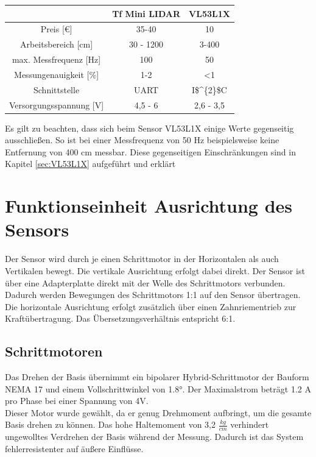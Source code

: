 \begin{center}
	\begin{tabular} [H] {|c|c|c|}
		\hline
		\textbf{} 				& \textbf{Tf Mini LIDAR}	& \textbf{VL53L1X} 	 \\ \hline
		Preis [€]				&  35-40					& 10			\\ \hline
		Arbeitsbereich [cm]		&  30 - 1200   				& 3-400			\\ \hline
		max. Messfrequenz [Hz]	&  100						& 50 			\\ \hline
		Messungenauigkeit [\%]	&  1-2 						& <1			\\ \hline
		Schnittstelle 			&  \ac{UART}				& \ac{I$^{2}$C}\\ \hline
		Versorgungsspannung [V] &  4,5 - 6 					& 2,6 - 3,5		\\ \hline
		
		\end {tabular}
		\label{vergleich}
	\end{center}

Es gilt zu beachten, dass sich beim Sensor VL53L1X einige Werte gegenseitig ausschließen. So ist bei einer Messfrequenz von 50 Hz beispielsweise keine Entfernung von 400 cm messbar. Diese gegenseitigen Einschränkungen sind in Kapitel \ref{sec:VL53L1X} aufgeführt und erklärt

 

\section{Funktionseinheit Ausrichtung des Sensors}

Der Sensor wird durch je einen Schrittmotor in der Horizontalen als auch Vertikalen bewegt. Die vertikale Ausrichtung erfolgt dabei direkt. Der Sensor ist über eine Adapterplatte direkt mit der Welle des Schrittmotors verbunden. Dadurch werden Bewegungen des Schrittmotors 1:1 auf den Sensor übertragen.\\ 
Die horizontale Ausrichtung erfolgt zusätzlich über einen Zahnriementrieb zur Kraftübertragung. Das Übersetzungsverhältnis entspricht 6:1.  

\subsection{Schrittmotoren}
Das Drehen der Basis übernimmt ein bipolarer Hybrid-Schrittmotor der Bauform \ac{NEMA} 17 und einem Vollschrittwinkel von 1.8°. Der Maximalstrom beträgt 1.2 A pro Phase bei einer Spannung von 4V.\\ 
Dieser Motor wurde gewählt, da er genug Drehmoment aufbringt, um die gesamte Basis drehen zu können. Das hohe Haltemoment von 3,2 $\frac{kg}{cm}$ verhindert ungewolltes Verdrehen der Basis während der Messung. Dadurch ist das System fehlerresistenter auf äußere Einflüsse. \cite{NEMA17} 


